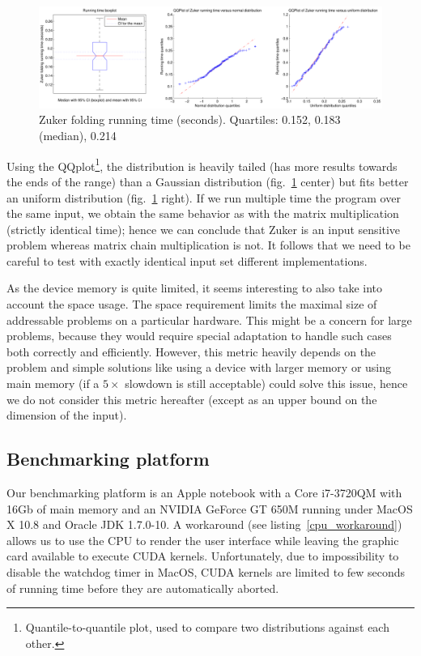 \documentclass[11pt]{article}
\begin{document}
\begin{figure}[H]\begin{center}\includegraphics[width=16cm]{inc/var_zuker.pdf}\end{center}
\caption{Zuker folding running time (seconds). Quartiles: 0.152, 0.183 (median), 0.214}\label{fig:var_zuker}\end{figure}

Using the QQplot\footnote{Quantile-to-quantile plot, used to compare two distributions against each other.}, the distribution is heavily tailed (has more results towards the ends of the range) than a Gaussian distribution (fig.~\ref{fig:var_zuker} center) but fits better an uniform distribution (fig.~\ref{fig:var_zuker} right). If we run multiple time the program over the same input, we obtain the same behavior as with the matrix multiplication (strictly identical time); hence we can conclude that Zuker is an input sensitive problem whereas matrix chain multiplication is not. It follows that we need to be careful to test with exactly identical input set different implementations.

As the device memory is quite limited, it seems interesting to also take into account the space usage. The space requirement limits the maximal size of addressable problems  on a particular hardware. This might be a concern for large problems, because they would require special adaptation to handle such cases both correctly and efficiently. However, this metric heavily depends on the problem and simple solutions like using a device with larger memory or using main memory (if a $5\times$ slowdown is still acceptable) could solve this issue, hence we do not consider this metric hereafter (except as an upper bound on the dimension of the input).

\subsection{Benchmarking platform}
Our benchmarking platform is an Apple notebook with a Core i7-3720QM with 16Gb of main memory and an NVIDIA GeForce GT 650M running under MacOS X 10.8 and Oracle JDK 1.7.0-10. A workaround (see listing~\ref{cpu_workaround}) allows us to use the CPU to render the user interface while leaving the graphic card available to execute CUDA kernels. Unfortunately, due to impossibility to disable the watchdog timer in MacOS, CUDA kernels are limited to few seconds of running time before they are automatically aborted.
\end{document}
